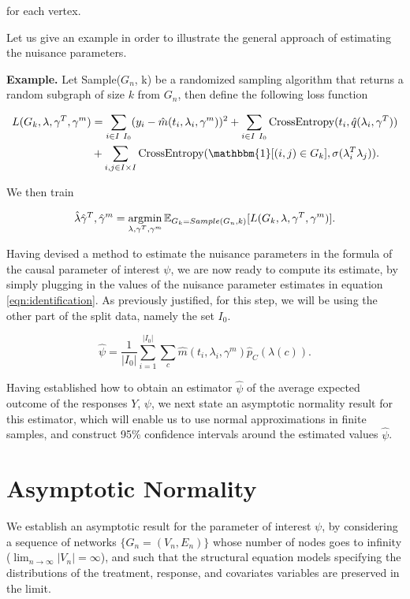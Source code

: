 \documentclass{article}
\begin{document}
\noindent for each vertex. 

Let us give an example in order to illustrate the general approach of estimating the nuisance parameters. 

\noindent \textbf{Example.} Let Sample($G_n$, k) be a randomized sampling algorithm that returns a random subgraph of size $k$ from $G_n$, then define the following loss function

\begin{align*}
L(G_k, \lambda, \gamma^T, \gamma^m) &= \sum_{i \in I \ I_0} (y_i -  \hat{m}(t_i, \lambda_i, \gamma^m))^2 + \sum_{i \in I \ I_0} \mbox{CrossEntropy}(t_i, \hat{q}(\lambda_i, \gamma^T))   \\
 &+ \sum_{i, j \in I \times I} \mbox{CrossEntropy} (\mathbbm{1}[(i, j) \in G_k], \sigma(\lambda_i^T \lambda_j)).
\end{align*}

\noindent We then train

$$\hat{\lambda} \hat{\gamma}^T, \hat{\gamma}^m = \operatorname*{argmin}_{\lambda, \gamma^T, \gamma^m} \mathbb{E}_{G_k = Sample(G_n, k)} [L(G_k, \lambda, \gamma^T, \gamma^m)]. $$


Having devised a method to estimate the nuisance parameters in the formula of the causal parameter of interest $\psi$, we are now ready to compute its estimate, by simply plugging in the values of the nuisance parameter estimates in equation \ref{eqn:identification}. As previously justified, for this step, we will be using the other part of the split data, namely the set $I_0$.

$$ \hat{\psi} = \frac{1}{|I_0|} \sum_{i=1}^{|I_0|} \sum_{c} \hat{m}(t_i, \lambda_i, \gamma^m) \hat{p}_C(\lambda(c)).$$

Having established how to obtain an estimator $\hat{\psi}$ of the average expected outcome of the responses $Y$, $\psi$, we next state an asymptotic normality result for this estimator, which will enable us to use normal approximations in finite samples, and construct 95\% confidence intervals around the estimated values $\hat{\psi}$. 



\section{Asymptotic Normality}

We establish an asymptotic result for the parameter of interest $\psi$, by considering a sequence of networks $\{G_n = (V_n, E_n)\}$ whose number of nodes goes to infinity ($\lim_{n \to \infty}|V_n| = \infty$), and such that the structural equation models specifying the distributions of the treatment, response, and covariates variables are preserved in the limit. 
\end{document}
